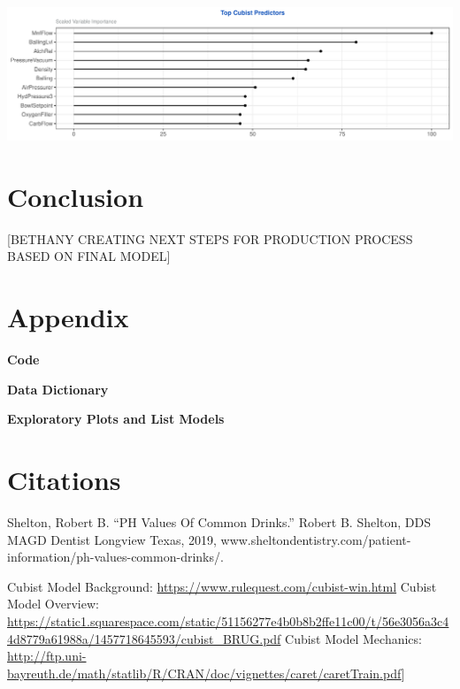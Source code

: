 \documentclass[]{report}
\begin{document}
\includegraphics{CONFLICT_Project_Update_files/figure-latex/unnamed-chunk-13-1.pdf}

\hypertarget{conclusion}{%
\chapter{Conclusion}\label{conclusion}}

{[}BETHANY CREATING NEXT STEPS FOR PRODUCTION PROCESS BASED ON FINAL
MODEL{]}

\hypertarget{Appendix}{%
\chapter*{Appendix}\label{Appendix}}

\textbf{Code}

\textbf{Data Dictionary}

\textbf{Exploratory Plots and List Models}

\hypertarget{citations}{%
\chapter{Citations}\label{citations}}

Shelton, Robert B. ``PH Values Of Common Drinks.'' Robert B. Shelton,
DDS MAGD Dentist Longview Texas, 2019,
www.sheltondentistry.com/patient-information/ph-values-common-drinks/.

Cubist Model Background: \url{https://www.rulequest.com/cubist-win.html}
Cubist Model Overview:
\url{https://static1.squarespace.com/static/51156277e4b0b8b2ffe11c00/t/56e3056a3c44d8779a61988a/1457718645593/cubist_BRUG.pdf}
Cubist Model Mechanics:
\url{http://ftp.uni-bayreuth.de/math/statlib/R/CRAN/doc/vignettes/caret/caretTrain.pdf}{]}
\end{document}
